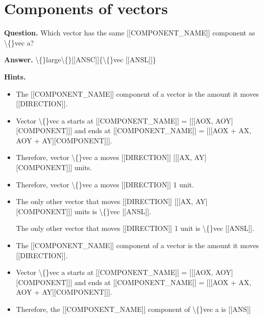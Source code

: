 \documentclass{article}
\begin{document}
\section*{Components of vectors}
\textbf{Question.} Which vector has the same [[COMPONENT\_NAME]] component as \textbackslash\{\}vec a?

\textbf{Answer.} \textbackslash\{\}large\textbackslash\{\}[[ANSC]]\{\textbackslash\{\}vec [[ANSL]]\}

\textbf{Hints.}
\begin{itemize}
  \item The [[COMPONENT\_NAME]] component of a vector is the amount it moves [[DIRECTION]].
  \item Vector \textbackslash\{\}vec a starts at [[COMPONENT\_NAME]] = [[[AOX, AOY][COMPONENT]]] and ends at [[COMPONENT\_NAME]] = [[[AOX + AX, AOY + AY][COMPONENT]]].
  \item Therefore, vector \textbackslash\{\}vec a moves [[DIRECTION]] [[[AX, AY][COMPONENT]]] units.
  \item Therefore, vector \textbackslash\{\}vec a moves [[DIRECTION]] 1 unit.
  \item The only other vector that moves [[DIRECTION]] [[[AX, AY][COMPONENT]]] units is
                            \textbackslash\{\}vec [[ANSL]].
                        
                        
                            The only other vector that moves [[DIRECTION]] 1 unit is \textbackslash\{\}vec [[ANSL]].
  \item The [[COMPONENT\_NAME]] component of a vector is the amount it moves [[DIRECTION]].
  \item Vector \textbackslash\{\}vec a starts at [[COMPONENT\_NAME]] = [[[AOX, AOY][COMPONENT]]] and ends at [[COMPONENT\_NAME]] = [[[AOX + AX, AOY + AY][COMPONENT]]].
  \item Therefore, the [[COMPONENT\_NAME]] component of \textbackslash\{\}vec a is [[ANS]]
\end{itemize}
\end{document}

